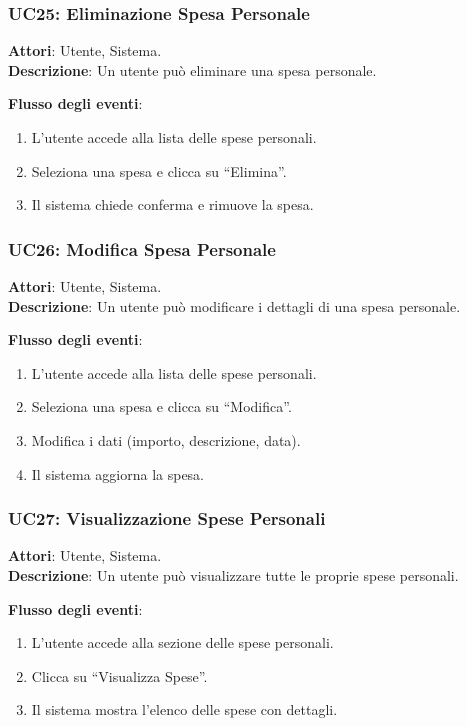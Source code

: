 \subsubsection{UC25: Eliminazione Spesa Personale}
\textbf{Attori}: Utente, Sistema. \\
\textbf{Descrizione}: Un utente può eliminare una spesa personale.

\textbf{Flusso degli eventi}:
\begin{enumerate}
    \item L’utente accede alla lista delle spese personali.
    \item Seleziona una spesa e clicca su ``Elimina''.
    \item Il sistema chiede conferma e rimuove la spesa.
\end{enumerate}

\subsubsection{UC26: Modifica Spesa Personale}
\textbf{Attori}: Utente, Sistema. \\
\textbf{Descrizione}: Un utente può modificare i dettagli di una spesa personale.

\textbf{Flusso degli eventi}:
\begin{enumerate}
    \item L’utente accede alla lista delle spese personali.
    \item Seleziona una spesa e clicca su ``Modifica''.
    \item Modifica i dati (importo, descrizione, data).
    \item Il sistema aggiorna la spesa.
\end{enumerate}

\subsubsection{UC27: Visualizzazione Spese Personali}
\textbf{Attori}: Utente, Sistema. \\
\textbf{Descrizione}: Un utente può visualizzare tutte le proprie spese personali.

\textbf{Flusso degli eventi}:
\begin{enumerate}
    \item L’utente accede alla sezione delle spese personali.
    \item Clicca su ``Visualizza Spese''.
    \item Il sistema mostra l’elenco delle spese con dettagli.
\end{enumerate}

